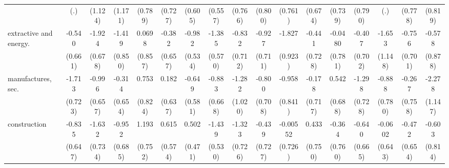{\begin{tabular}{l*{16}{c}}
                    &         (.)         &     (1.124)         &     (1.171)         &     (0.789)         &     (0.727)         &     (0.605)         &     (0.557)         &     (0.766)         &     (0.800)         &     (0.761)         &     (0.674)         &     (0.739)         &     (0.790)         &         (.)         &     (0.778)         &     (0.819)         \\
[1em]
extractive and energy.&      -0.540         &      -1.924\sym{**} &      -1.419         &      0.0698         &      -0.382         &      -0.982         &      -1.385\sym{*}  &      -0.832         &      -0.927         &      -1.827\sym{*}  &      -0.441         &     -0.0480         &      -0.407         &      -1.653         &      -0.756         &      -0.578         \\
                    &     (0.661)         &     (0.678)         &     (0.850)         &     (0.857)         &     (0.657)         &     (0.534)         &     (0.570)         &     (0.712)         &     (0.711)         &     (0.923)         &     (0.728)         &     (0.781)         &     (0.702)         &     (1.148)         &     (0.701)         &     (0.878)         \\
[1em]
manufactures, sec.  &      -1.713\sym{*}  &      -0.996         &      -0.314         &       0.753         &       0.182         &      -0.649         &      -0.883         &      -1.282         &      -0.800         &      -0.958         &      -0.178         &       0.542         &      -1.298         &      -0.888         &      -0.267         &      -2.278\sym{*}  \\
                    &     (0.723)         &     (0.657)         &     (0.654)         &     (0.824)         &     (0.637)         &     (0.581)         &     (0.668)         &     (1.020)         &     (0.708)         &     (0.841)         &     (0.717)         &     (0.688)         &     (0.728)         &     (0.780)         &     (0.758)         &     (1.147)         \\
[1em]
construction        &      -0.835         &      -1.632\sym{*}  &      -0.952         &       1.193         &       0.615         &       0.502         &      -1.439\sym{**} &      -1.323         &      -0.439         &    -0.00552         &       0.433         &      -0.364         &      -0.640         &     -0.0602         &      -0.472         &      -0.603         \\
                    &     (0.647)         &     (0.734)         &     (0.685)         &     (0.752)         &     (0.574)         &     (0.471)         &     (0.530)         &     (0.726)         &     (0.727)         &     (0.726)         &     (0.750)         &     (0.760)         &     (0.665)         &     (0.643)         &     (0.654)         &     (0.814)         \\

\end{tabular}}

